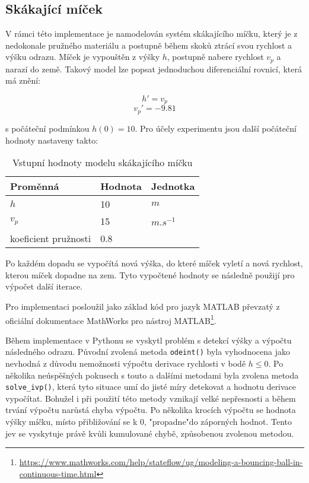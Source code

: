 \subsection{Skákající míček}
V rámci této implementace je namodelován systém skákajícího míčku, který je z nedokonale pružného materiálu a postupně během skoků ztrácí svou rychlost a výšku odrazu. Míček je vypouštěn z výšky $h$, postupně nabere rychlost $v_p$ a narazí do země. Takový model lze popsat jednoduchou diferenciální rovnicí, která má znění:

\begin{equation}
    h' = v_p
\end{equation}
\begin{equation}
    v_p ' = -9.81
\end{equation}

s počáteční podmínkou $h(0) = 10$. Pro účely experimentu jsou další počáteční hodnoty nastaveny takto:

\begin{center}
\begin{table}[ht]
    \centering
\begin{tabular}{|l|l|l|}
\hline
Proměnná             & Hodnota & Jednotka    \\ \hline
$h$                    &   10     & $m$     \\ \hline
$v_p$                   &    15   & $m.s^{-1}$ \\ \hline
koeficient pružnosti &  0.8    &             \\ \hline
\end{tabular}
    \caption{Vstupní hodnoty modelu skákajícího míčku}
    \label{tab:micek-hodnoty}
\end{table}
\end{center}

Po každém dopadu se vypočítá nová výška, do které míček vyletí a nová rychlost, kterou míček dopadne na zem. Tyto vypočtené hodnoty se následně použijí pro výpočet další iterace. 

Pro implementaci posloužil jako základ kód pro jazyk MATLAB převzatý z oficiální dokumentace MathWorks pro nástroj MATLAB\footnote{\url{https://www.mathworks.com/help/stateflow/ug/modeling-a-bouncing-ball-in-continuous-time.html}}.

Během implementace v Pythonu se vyskytl problém s detekcí výšky a výpočtu následného odrazu. Původní zvolená metoda \texttt{odeint()} byla vyhodnocena jako nevhodná z důvodu nemožnosti výpočtu derivace rychlosti v bodě $h\leq0$. Po několika neúspěšných pokusech s touto a dalšími metodami byla zvolena metoda \texttt{solve\_ivp()}, která tyto situace umí do jisté míry detekovat a hodnotu derivace vypočítat. Bohužel i při použití této metody vznikají velké nepřesnosti a během trvání výpočtu narůstá chyba výpočtu. Po několika krocích výpočtu se hodnota výšky míčku, místo přibližování se k 0, "propadne"\space do záporných hodnot. Tento jev se vyskytuje právě kvůli kumulované chybě, způsobenou zvolenou metodou.

